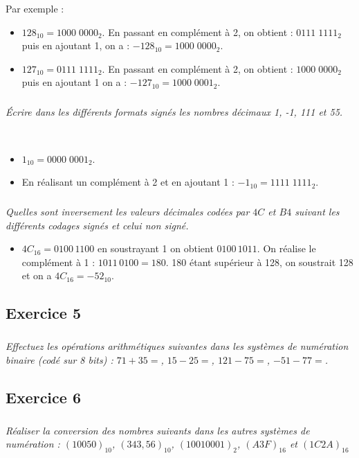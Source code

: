 \documentclass[10pt,fleqn]{article} %
\begin{document}
\begin{multicols}{2}
\begin{corrige}
Par exemple : 
\begin{itemize}
\item $128_{10}=1000\; 0000_2$. En passant en complément à 2, on obtient :
$0111\; 1111_2$ puis en ajoutant 1, on a : $-128_{10} = 1000\; 0000_2$.
\item $127_{10}=0111\; 1111_2$. En passant en complément à 2, on obtient :
$1000\; 0000_2$ puis en ajoutant 1 on a : $-127_{10} = 1000\; 0001_2$.
\end{itemize}
\end{corrige}
\subparagraph{}
\textit{Écrire dans les différents formats signés les nombres décimaux 1, -1, 111 et 55.}

\begin{corrige}
~\\
\begin{itemize}
\item $1_{10}=0000\;0001_{2}$.
\item En réalisant un complément à 2 et en ajoutant 1 : $-1_{10}=1111\;1111_{2}$.
\end{itemize}
\end{corrige}

\subparagraph{}
\textit{Quelles sont inversement les valeurs décimales codées par $4C$ et $B4$ suivant les différents codages signés et celui non signé.}
\begin{corrige}
\begin{itemize}
\item $4C_{16}=0100\, 1100$ en soustrayant 1 on obtient $0100\, 1011$. On réalise le complément à 1 : $1011\, 0100=180$. 180  étant supérieur à 128, on soustrait 128 et on a 
$4C_{16}=-52_{10}$.
\end{itemize}
\end{corrige}




\subsection*{Exercice 5}
\setcounter{subparagraph}{0}
\subparagraph*{}
\textit{Effectuez les opérations arithmétiques suivantes dans les systèmes de numération binaire (codé sur 8 bits) : $71 + 35 =$, $15 - 25 =$, $121 - 75 =$, $-51 - 77 =$.}


\subsection*{Exercice 6}
\setcounter{subparagraph}{0}
\subparagraph{}\textit{Réaliser la conversion des nombres suivants dans les autres systèmes de numération : $(10050)_{10}$, $(343,56)_{10}$, $(1001 0001)_{2}$, $(A3F)_{16}$ et $(1C2A)_{16}$}


\end{multicols}
\end{document}
